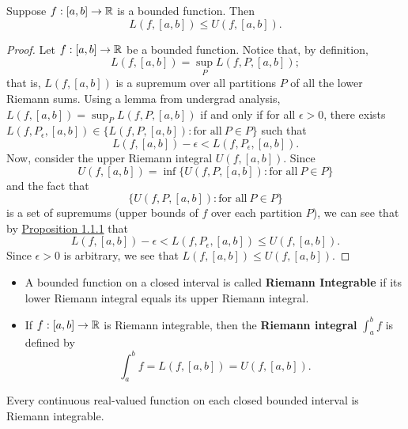 \documentclass[11pt,a4paper]{book}
\begin{document}
\begin{prop}
    Suppose \( f: [a,b] \to \mathbb{R}  \) is a bounded function. Then 
    \[  L(f,[a,b]) \leq U(f,[a,b]). \]
\end{prop}
\begin{proof}
    Let \( f: [a,b] \to \mathbb{R}  \) be a bounded function. Notice that, by definition, 
    \[  L(f,[a,b]) = \sup_{P} L(f,P,[a,b]); \]
    that is, \( L(f,[a,b]) \) is a supremum over all partitions \( P  \) of all the lower Riemann sums. Using a lemma from undergrad analysis, \( L(f,[a,b]) = \sup_{P} L(f,P,[a,b]) \) if and only if for all \( \epsilon > 0  \), there exists \( L(f,{P}_{\epsilon}, [a,b]) \in \{ L(f,P,[a,b]) : \text{for all} \ P \in P \}   \) such that 
    \[  L(f, [a,b]) - \epsilon < L(f, {P}_{\epsilon}, [a,b]).  \]
    Now, consider the upper Riemann integral \( U(f,[a,b]) \). Since 
    \[  U(f,[a,b]) = \inf \{ U(f,P,[a,b]) :  \text{for all} \ P \in P \}  \]
    and the fact that 
    \[  \{  U(f,P,[a,b]) :  \text{for all} \ P \in P\}  \]
    is a set of supremums (upper bounds of \( f \) over each partition \( P \)), we can see that by {\hyperref[Inequalities with Riemann Sums]{Proposition 1.1.1}} that 
    \[  L(f, [a,b]) - \epsilon < L(f, {P}_{\epsilon}, [a,b]) \leq U(f,[a,b]).  \]
    Since \( \epsilon > 0  \) is arbitrary, we see that \( L(f,[a,b]) \leq U(f,[a,b]) \).
\end{proof}

\begin{definition}
    \begin{itemize}
        \item A bounded function on a closed interval is called \textbf{Riemann Integrable} if its lower Riemann integral equals its upper Riemann integral.
        \item If \( f: [a,b] \to \mathbb{R}  \) is Riemann integrable, then the \textbf{Riemann integral} \( \int_{ a }^{ b }  f  \) is defined by
            \[ \int_{ a }^{ b }  f = L(f,[a,b]) = U(f,[a,b]). \]
    \end{itemize}
\end{definition}

\begin{prop}
    Every continuous real-valued function on each closed bounded interval is Riemann integrable.
\end{prop}
\end{document}
